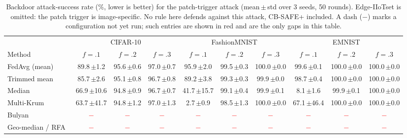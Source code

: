 \begin{table}[t]\centering\footnotesize
\caption{Backdoor attack-success rate (\%, lower is better) for the patch-trigger attack (mean\,$\pm$\,std over 3 seeds, 50 rounds). Edge-IIoTset is omitted: the patch trigger is image-specific. No rule here defends against this attack, CB-SAFE+ included. A dash ($-$) marks a configuration not yet run; such entries are shown in red and are the only gaps in this table.}
\label{tab:backdoor}
\setlength{\tabcolsep}{4pt}
\begin{tabular}{@{}lccccccccc@{}}\toprule
& \multicolumn{3}{c}{CIFAR-10} & \multicolumn{3}{c}{FashionMNIST} & \multicolumn{3}{c}{EMNIST}\\
\cmidrule(lr){2-4}\cmidrule(lr){5-7}\cmidrule(l){8-10}
Method & $f{=}.1$ & $f{=}.2$ & $f{=}.3$ & $f{=}.1$ & $f{=}.2$ & $f{=}.3$ & $f{=}.1$ & $f{=}.2$ & $f{=}.3$\\\midrule
FedAvg (mean)~\cite{mcmahan2017} & 89.8\,{\scriptsize$\pm$1.2} & 95.6\,{\scriptsize$\pm$0.6} & 97.0\,{\scriptsize$\pm$0.7} & 95.9\,{\scriptsize$\pm$2.0} & 99.5\,{\scriptsize$\pm$0.3} & 100.0\,{\scriptsize$\pm$0.0} & 99.6\,{\scriptsize$\pm$0.1} & 100.0\,{\scriptsize$\pm$0.0} & 100.0\,{\scriptsize$\pm$0.0}\\
Trimmed mean~\cite{yin2018} & 85.7\,{\scriptsize$\pm$2.6} & 95.1\,{\scriptsize$\pm$0.8} & 96.7\,{\scriptsize$\pm$0.8} & 89.2\,{\scriptsize$\pm$3.8} & 99.3\,{\scriptsize$\pm$0.3} & 99.9\,{\scriptsize$\pm$0.0} & 98.7\,{\scriptsize$\pm$0.4} & 100.0\,{\scriptsize$\pm$0.0} & 100.0\,{\scriptsize$\pm$0.0}\\
Median~\cite{yin2018} & 66.9\,{\scriptsize$\pm$10.6} & 94.8\,{\scriptsize$\pm$0.9} & 96.7\,{\scriptsize$\pm$0.7} & 41.7\,{\scriptsize$\pm$15.7} & 99.1\,{\scriptsize$\pm$0.4} & 99.9\,{\scriptsize$\pm$0.1} & 8.1\,{\scriptsize$\pm$1.6} & 99.9\,{\scriptsize$\pm$0.1} & 100.0\,{\scriptsize$\pm$0.0}\\
Multi-Krum~\cite{blanchard2017} & 63.7\,{\scriptsize$\pm$41.7} & 94.8\,{\scriptsize$\pm$1.2} & 97.0\,{\scriptsize$\pm$1.3} & 2.7\,{\scriptsize$\pm$0.9} & 98.5\,{\scriptsize$\pm$1.3} & 100.0\,{\scriptsize$\pm$0.0} & 67.1\,{\scriptsize$\pm$46.4} & 100.0\,{\scriptsize$\pm$0.0} & 100.0\,{\scriptsize$\pm$0.0}\\
Bulyan~\cite{bulyan} & \textcolor{red}{$-$} & \textcolor{red}{$-$} & \textcolor{red}{$-$} & \textcolor{red}{$-$} & \textcolor{red}{$-$} & \textcolor{red}{$-$} & \textcolor{red}{$-$} & \textcolor{red}{$-$} & \textcolor{red}{$-$}\\
Geo-median / RFA~\cite{rfa} & \textcolor{red}{$-$} & \textcolor{red}{$-$} & \textcolor{red}{$-$} & \textcolor{red}{$-$} & \textcolor{red}{$-$} & \textcolor{red}{$-$} & \textcolor{red}{$-$} & \textcolor{red}{$-$} & \textcolor{red}{$-$}\\

\end{tabular}
\end{table}
